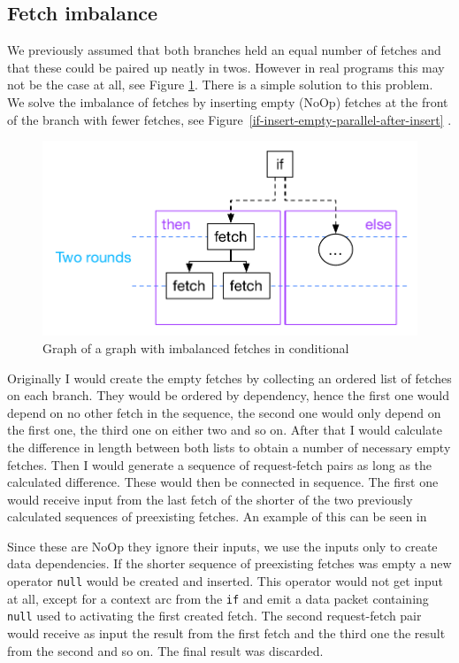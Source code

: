 \subsection{Fetch imbalance}

We previously assumed that both branches held an equal number of fetches and that these could be paired up neatly in twos.
However in real programs this may not be the case at all, see Figure \ref{fig:if-insert-empty-parallel-before}.
There is a simple solution to this problem.
We solve the imbalance of fetches by inserting empty (NoOp) fetches at the front of the branch with fewer fetches, see Figure~\ref{if-insert-empty-parallel-after-insert} .

\begin{figure}
    \includegraphics[width=\linewidth]{../Figures/if-insert-empty-parallel-before}
    \caption{Graph of a graph with imbalanced fetches in conditional}
    \label{fig:if-insert-empty-parallel-before}
\end{figure}

Originally I would create the empty fetches by collecting an ordered list of fetches on each branch.
They would be ordered by dependency, hence the first one would depend on no other fetch in the sequence, the second one would only depend on the first one, the third one on either two and so on.
After that I would calculate the difference in length between both lists to obtain a number of necessary empty fetches.
Then I would generate a sequence of request-fetch pairs as long as the calculated difference.
These would then be connected in sequence.
The first one would receive input from the last fetch of the shorter of the two previously calculated sequences of preexisting fetches.
An example of this can be seen in

Since these are NoOp they ignore their inputs, we use the inputs only to create data dependencies.
If the shorter sequence of preexisting fetches was empty a new operator \texttt{null} would be created and inserted.
This operator would not get input at all, except for a context arc from the \texttt{if} and emit a data packet containing \texttt{null} used to activating the first created fetch.
The second request-fetch pair would receive as input the result from the first fetch and the third one the result from the second and so on.
The final result was discarded.

